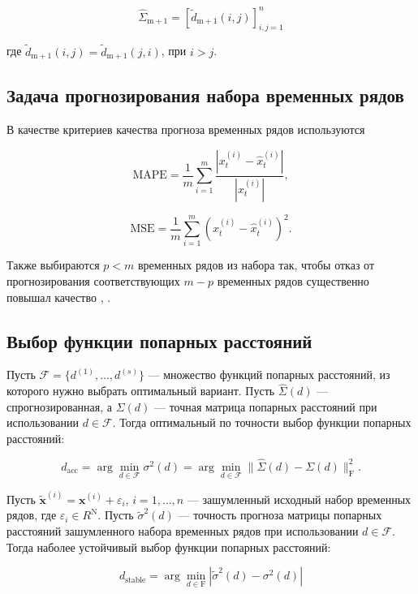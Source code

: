 \documentclass{article}
\begin{document}
\begin{equation}
    \hat{\Sigma}_{\text{m} + 1} = [\widetilde{d}_{\text{m} + 1}(i, j)]_{i, j = 1}^{n}
\end{equation}

где $\widetilde{d}_{\text{m} + 1}(i, j) = \widetilde{d}_{\text{m} + 1}(j, i)$, при $i > j$.

\subsection{Задача прогнозирования набора временных рядов}

В качестве критериев качества прогноза временных рядов используются 

\begin{equation}
    \text{MAPE} = \frac{1}{m}\sum\limits_{i = 1}^{m}\dfrac{|x^{(i)}_t - \hat{x}^{(i)}_t|}{|x^{(i)}_t|},
\end{equation}

\begin{equation}
    \text{MSE} = \frac{1}{m}\sum\limits_{i = 1}^{m}(x^{(i)}_t - \hat{x}^{(i)}_t)^2.
\end{equation}

Также выбираются $p < m$ временных рядов из набора так, чтобы отказ от прогнозирования соответствующих $m - p$ временных рядов существенно повышал качество , . 

\subsection{Выбор функции попарных расстояний}

Пусть $\mathcal{F} = \{d^{(1)}, \ldots, d^{(s)}\}$ --- множество функций попарных расстояний, из которого нужно выбрать оптимальный вариант. Пусть $\hat{\Sigma}(d)$ --- спрогнозированная, а $\Sigma(d)$ --- точная матрица попарных расстояний при использовании $d \in \mathcal{F}$. Тогда оптимальный по точности выбор функции попарных расстояний:

\begin{equation}
    d_{\text{acc}} = \arg\min\limits_{d \in \mathcal{F}} \sigma^2(d) = \arg\min\limits_{d \in \mathcal{F}} \|\hat{\Sigma}(d) - \Sigma(d)\|_{\text{F}}^2.
\end{equation}

Пусть $\widetilde{\mathbf{x}}^{(i)} = \mathbf{x}^{(i)} + \varepsilon_i$, $i = 1, \ldots, n$ --- зашумленный исходный набор временных рядов, где $\varepsilon_i \in R^\text{N}$. Пусть $\widetilde{\sigma}^2(d)$ --- точность прогноза матрицы попарных расстояний зашумленного набора временных рядов при использовании $d \in \mathcal{F}$. Тогда наболее устойчивый выбор функции попарных расстояний:

\begin{equation}
    d_{\text{stable}} = \arg\min\limits_{d \in \text{F}}|\widetilde{\sigma}^2(d) - \sigma^2(d)|
\end{equation}



\end{document}
